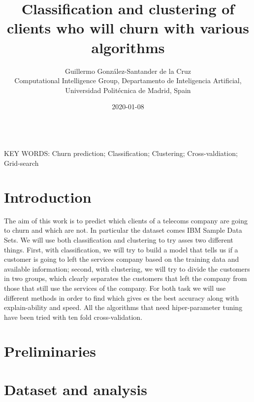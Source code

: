 \documentclass[a4paper,11pt]{article}
\begin{document}
\title{Classification and clustering of clients who will churn with various algorithms}

\author{{Guillermo González-Santander de la Cruz}\\
{\small Computational Intelligence Group, Departamento de Inteligencia Artificial, Universidad Politécnica de Madrid, Spain}}

\date{2020-01-08}
\maketitle



\begin{abstract}
\end{abstract}


\ \\
KEY WORDS: Churn prediction; Classification; Clustering; Cross-valdiation; Grid-search

\section{Introduction}

The aim of this work is to predict which clients of a telecoms company are going to churn and which are not. In particular the dataset comes IBM Sample Data Sets.
We will use both classification and clustering to try asses two different things. First, with classification, we will try to build a model that tells us if a customer is going to left the services company based on the training data and available information; second, with clustering, we will try to divide the customers in two groups, which clearly separates the customers that left the company from those that still use the services of the company.
For both task we will use different methods in order to find which gives es the best accuracy along with explain-ability and speed.
All the algorithms that need hiper-parameter tuning have been tried with ten fold cross-validation.

\section{Preliminaries}

\section{Dataset and analysis}
\end{document}
